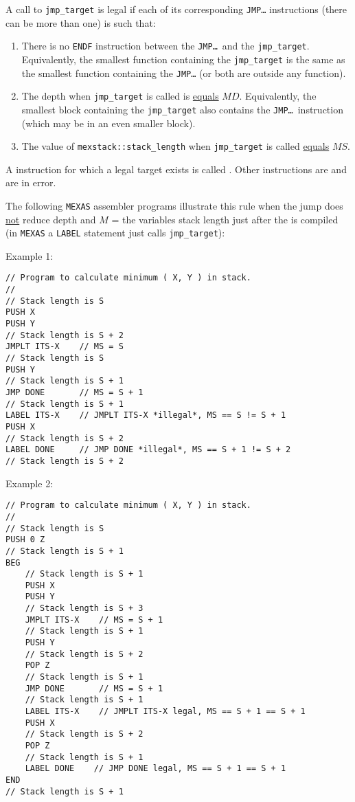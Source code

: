 \documentclass[12pt]{article}
\begin{document}
A call to {\tt jmp\_target} is legal if each of its
corresponding {\tt JMP\ldots} instructions (there can be more than one)
is such that:
\begin{enumerate}
\item
There is no {\tt ENDF} instruction between the
{\tt JMP\ldots}~and the {\tt jmp\_target}.
Equivalently, the smallest function containing the {\tt jmp\_target}
is the same as the smallest function containing the {\tt JMP\ldots}
(or both are outside any function).
\item The depth when {\tt jmp\_target} is called is \underline{equals} $MD$.
Equivalently, the smallest block containing the {\tt jmp\_target}
also contains the {\tt JMP\ldots}~instruction (which may be in an even
smaller block).
\item The value of {\tt mexstack::stack\_length} when {\tt jmp\_target}
is called \underline{equals} $MS$.
\end{enumerate}

A  instruction for which a legal target exists
is called .  Other  instructions
are  and are in error.

The following {\tt MEXAS} assembler programs illustrate this
rule when the jump does \underline{not}
reduce depth and $M$ = the variables stack length just after the
 is compiled (in {\tt MEXAS} a {\tt LABEL} statement
just calls {\tt jmp\_target}):

Example 1:
\begin{indpar}\begin{verbatim}
// Program to calculate minimum ( X, Y ) in stack.
//
// Stack length is S
PUSH X
PUSH Y
// Stack length is S + 2
JMPLT ITS-X    // MS = S
// Stack length is S
PUSH Y
// Stack length is S + 1
JMP DONE       // MS = S + 1
// Stack length is S + 1
LABEL ITS-X    // JMPLT ITS-X *illegal*, MS == S != S + 1
PUSH X
// Stack length is S + 2
LABEL DONE     // JMP DONE *illegal*, MS == S + 1 != S + 2
// Stack length is S + 2
\end{verbatim}\end{indpar}

Example 2:
\begin{indpar}\begin{verbatim}
// Program to calculate minimum ( X, Y ) in stack.
//
// Stack length is S
PUSH 0 Z
// Stack length is S + 1
BEG
    // Stack length is S + 1
    PUSH X
    PUSH Y
    // Stack length is S + 3
    JMPLT ITS-X    // MS = S + 1
    // Stack length is S + 1
    PUSH Y
    // Stack length is S + 2
    POP Z
    // Stack length is S + 1
    JMP DONE       // MS = S + 1
    // Stack length is S + 1
    LABEL ITS-X    // JMPLT ITS-X legal, MS == S + 1 == S + 1
    PUSH X
    // Stack length is S + 2
    POP Z
    // Stack length is S + 1
    LABEL DONE    // JMP DONE legal, MS == S + 1 == S + 1
END
// Stack length is S + 1
\end{verbatim}\end{indpar}
\end{document}
